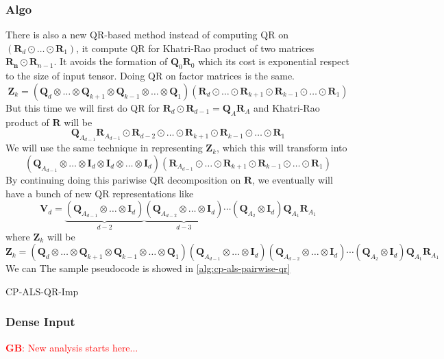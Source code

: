 \documentclass{article}
\newcommand{\mat}[1]{\mathbf{#1}}
\newcommand{\GB}[1]{\textcolor{red}{\textbf{GB}: #1}}
\begin{document}
\subsubsection{Algo}
There is also a new QR-based method instead of computing QR on $(\mat{R}_d \odot \dots \odot \mat{R}_1)$, it compute QR for Khatri-Rao product of two matrices $\mat{R_n} \odot \mat{R}_{n-1}$.
It avoids the formation of $\mat{Q}_0\mat{R}_0$ which its cost is exponential respect to the size of input tensor.
Doing QR on factor matrices is the same.
$$\mat{Z}_k = (\mat{Q}_d \otimes \dots \otimes \mat{Q}_{k+1} \otimes \mat{Q}_{k-1} \otimes \dots \otimes \mat{Q}_1)(\mat{R}_d \odot \dots \odot \mat{R}_{k+1} \odot \mat{R}_{k-1} \odot \dots \odot \mat{R}_1)$$
But this time we will first do QR for $\mat{R}_d \odot \mat{R}_{d-1} = \mat{Q}_{A}\mat{R}_A$ and Khatri-Rao product of $\mat{R}$ will be 
$$\mat{Q}_{A_{d-1}}\mat{R}_{A_{d-1}} \odot \mat{R}_{d-2} \odot \dots \odot \mat{R}_{k+1} \odot \mat{R}_{k-1} \odot \dots \odot \mat{R}_1$$
We will use the same technique in representing $\mat{Z}_k$, which this will transform into 
$$(\mat{Q}_{A_{d-1}} \otimes \dots \otimes \mat{I}_d \otimes \mat{I}_d \otimes \dots  \otimes  \mat{I}_d)(\mat{R}_{A_{d-1}} \odot \dots \odot \mat{R}_{k+1} \odot \mat{R}_{k-1} \odot \dots \odot \mat{R}_1)$$
By continuing doing this pariwise QR decomposition on $\mat{R}$, we eventually will have a bunch of new QR representations like
$$\mat{V}_d = \underbrace{(\mat{Q}_{A_{d-1}} \otimes \dots  \otimes  \mat{I}_d)}_{d-2}\underbrace{(\mat{Q}_{A_{d-2}} \otimes \dots \otimes \mat{I}_d)}_{d-3} \cdots (\mat{Q}_{A_{2}} \otimes \mat{I}_d) \mat{Q}_{A_{1}}\mat{R}_{A_{1}}$$
where $\mat{Z}_k$ will be 
$$\mat{Z}_k = (\mat{Q}_d \otimes \dots \otimes \mat{Q}_{k+1} \otimes \mat{Q}_{k-1} \otimes \dots \otimes \mat{Q}_1) (\mat{Q}_{A_{d-1}} \otimes \dots  \otimes  \mat{I}_d)(\mat{Q}_{A_{d-2}} \otimes \dots \otimes \mat{I}_d) \cdots (\mat{Q}_{A_{2}} \otimes \mat{I}_d) \mat{Q}_{A_{1}}\mat{R}_{A_{1}}$$
We can 
The sample pseudocode is showed in \cref{alg:cp-als-pairwise-qr} 
\begin{algorithm}
  \caption{CP-ALS-QR-Imp}
  \label{alg:cp-als-pairwise-qr}
  
\end{algorithm}
\subsubsection{Dense Input}



\GB{New analysis starts here...}
\end{document}
